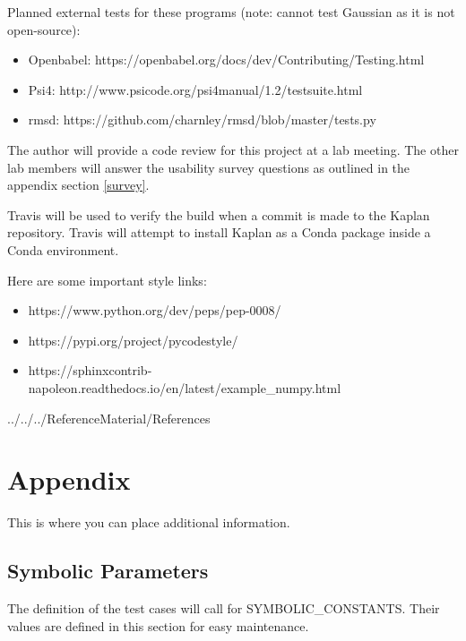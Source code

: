 \documentclass[12pt, titlepage]{article}
\newcommand{\progname}{Kaplan} %
\begin{document}
Planned external tests for these programs (note: cannot test Gaussian as it is 
not open-source):

\begin{itemize}
	\item Openbabel: https://openbabel.org/docs/dev/Contributing/Testing.html
	\item Psi4: http://www.psicode.org/psi4manual/1.2/testsuite.html
	\item rmsd: https://github.com/charnley/rmsd/blob/master/tests.py
\end{itemize}

The author will provide a code review for this project at a lab meeting. The 
other lab members will answer the usability survey questions as outlined in the 
appendix section \ref{survey}.
				
Travis will be used to verify the build when a commit is made to the 
\progname{} repository. Travis will attempt to install \progname{} as a Conda 
package inside a Conda environment. 

Here are some important style links:

\begin{itemize}
	
\item https://www.python.org/dev/peps/pep-0008/
\item https://pypi.org/project/pycodestyle/
\item 
https://sphinxcontrib-napoleon.readthedocs.io/en/latest/example\_numpy.html

\end{itemize}




 {../../../ReferenceMaterial/References}

\newpage

\section{Appendix}

This is where you can place additional information.

\subsection{Symbolic Parameters}

The definition of the test cases will call for SYMBOLIC\_CONSTANTS.
Their values are defined in this section for easy maintenance.
\end{document}
